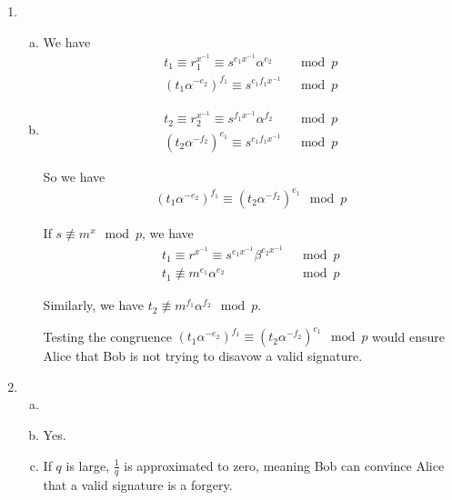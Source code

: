\documentclass[11pt,a4paper]{article}
\begin{document}
\begin{enumerate}
\item
	\begin{enumerate}[a)]
	\item We have
		\begin{align*}
		t_{1} \equiv r_{1}^{x^{-1}} \equiv s^{e_{1}x^{-1}}\alpha^{e_{2}} &\mod p \\
		\left(t_{1}\alpha^{-e_{2}}\right)^{f_{1}} \equiv s^{e_{1}f_{1}x^{-1}} &\mod p
		\end{align*}
	
	\item
		\begin{align*}
		t_{2} \equiv r_{2}^{x^{-1}} \equiv s^{f_{1}x^{-1}}\alpha^{f_{2}} &\mod p \\
		\left(t_{2}\alpha^{-f_{2}}\right)^{e_{1}} \equiv s^{e_{1}f_{1}x^{-1}} &\mod p
		\end{align*}
	\par So we have 
		\begin{align*}
		\left(t_{1}\alpha^{-e_{2}}\right)^{f_{1}} \equiv \left(t_{2}\alpha^{-f_{2}}\right)^{e_{1}} \mod p
		\end{align*}
	\par If $s \not\equiv m^{x} \mod p$, we have
		\begin{align*}
		t_{1} \equiv r^{x^{-1}} \equiv s^{e_{1}x^{-1}}\beta^{e_{2}x^{-1}} &\mod p \\
		t_{1} \not\equiv m^{e_{1}}\alpha^{e_{2}} &\mod p
		\end{align*}
	\par Similarly, we have $t_{2} \not\equiv m^{f_{1}}\alpha^{f_{2}} \mod p$.
	\par Testing the congruence $\left(t_{1} \alpha^{-e_{2}} \right)^{f_{1}} \equiv \left(t_{2}\alpha^{-f_{2}}\right)^{e_{1}} \mod p$ would ensure Alice that Bob is not trying to disavow a valid signature.
	\end{enumerate}

\item
	\begin{enumerate}[a)]
	\item
	
	\item Yes.
	
	\item If $q$ is large, $\frac{1}{q}$ is approximated to zero, meaning Bob can convince Alice that a valid signature is a forgery.
	\end{enumerate}
\end{enumerate}
\end{document}
